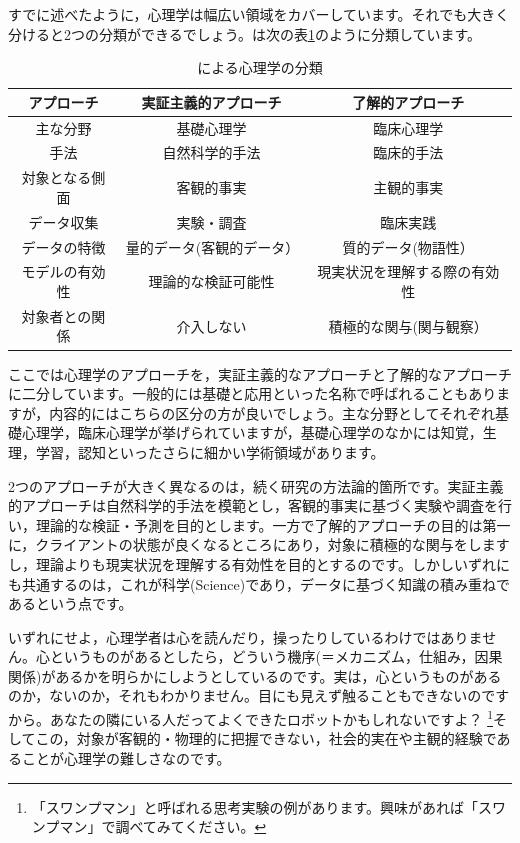 \documentclass{ltjsbook}
\begin{document}
すでに述べたように，心理学は幅広い領域をカバーしています。それでも大きく分けると2つの分類ができるでしょう。\citet{下山2001}は次の表\ref{tbl01_01}のように分類しています。

\begin{table}[hb]
    \centering
    \caption{\citet{下山2001}による心理学の分類}
    \begin{tabular}{ccc}
    アプローチ   & 実証主義的アプローチ    & 了解的アプローチ       \\\hline\hline
    主な分野    & 基礎心理学         & 臨床心理学          \\
    手法      & 自然科学的手法       & 臨床的手法          \\
    対象となる側面 & 客観的事実         & 主観的事実          \\
    データ収集   & 実験・調査         & 臨床実践           \\
    データの特徴  & 量的データ(客観的データ） & 質的データ(物語性）     \\
    モデルの有効性 & 理論的な検証可能性     & 現実状況を理解する際の有効性 \\
    対象者との関係 & 介入しない         & 積極的な関与(関与観察） \\\hline 
    \end{tabular}
    \label{tbl01_01}
\end{table}
ここでは心理学のアプローチを，実証主義的なアプローチと了解的なアプローチに二分しています。一般的には基礎と応用といった名称で呼ばれることもありますが，内容的にはこちらの区分の方が良いでしょう。主な分野としてそれぞれ基礎心理学，臨床心理学が挙げられていますが，基礎心理学のなかには知覚，生理，学習，認知といったさらに細かい学術領域があります。

2つのアプローチが大きく異なるのは，続く研究の方法論的箇所です。実証主義的アプローチは自然科学的手法を模範とし，客観的事実に基づく実験や調査を行い，理論的な検証・予測を目的とします。一方で了解的アプローチの目的は第一に，クライアントの状態が良くなるところにあり，対象に積極的な関与をしますし，理論よりも現実状況を理解する有効性を目的とするのです。しかしいずれにも共通するのは，これが科学(Science)であり，データに基づく知識の積み重ねであるという点です。

いずれにせよ，心理学者は心を読んだり，操ったりしているわけではありません。心というものがあるとしたら，どういう機序(＝メカニズム，仕組み，因果関係)があるかを明らかにしようとしているのです。実は，心というものがあるのか，ないのか，それもわかりません。目にも見えず触ることもできないのですから。あなたの隣にいる人だってよくできたロボットかもしれないですよ？ \footnote{「スワンプマン」と呼ばれる思考実験の例があります。興味があれば「スワンプマン」で調べてみてください。}そしてこの，対象が客観的・物理的に把握できない，社会的実在や主観的経験であることが心理学の難しさなのです。
\end{document}
